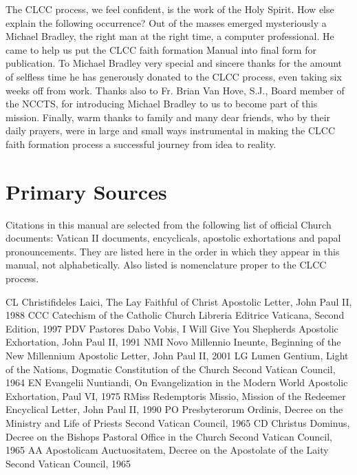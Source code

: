 \documentclass[oneside]{book}
\begin{document}
The CLCC process, we feel confident, is the work of the Holy Spirit. How else
explain the following occurrence? Out of the masses emerged mysteriously a
Michael Bradley, the right man at the right time, a computer professional. He
came to help us put the CLCC faith formation Manual into final form for
publication. To Michael Bradley very special and sincere thanks for the amount
of selfless time he has generously donated to the CLCC process, even taking six
weeks off from work. Thanks also to Fr. Brian Van Hove, S.J., Board member of
the NCCTS, for introducing Michael Bradley to us to become part of this
mission. Finally, warm thanks to family and many dear friends, who by their
daily prayers, were in large and small ways instrumental in making the CLCC
faith formation process a successful journey from idea to reality.


\pagebreak
\tableofcontents


\chapter{Primary Sources}

Citations in this manual are selected from the following list of official Church
documents: Vatican II documents, encyclicals, apostolic exhortations and papal
pronouncements. They are listed here in the order in which they appear in this
manual, not alphabetically. Also listed is nomenclature proper to the CLCC
process.

CL Christifideles Laici, The Lay Faithful of Christ Apostolic Letter, John Paul
II, 1988 CCC Catechism of the Catholic Church Libreria Editrice Vaticana, Second
Edition, 1997 PDV Pastores Dabo Vobis, I Will Give You Shepherds Apostolic
Exhortation, John Paul II, 1991 NMI Novo Millennio Ineunte, Beginning of the New
Millennium Apostolic Letter, John Paul II, 2001 LG Lumen Gentium, Light of the
Nations, Dogmatic Constitution of the Church Second Vatican Council, 1964 EN
Evangelii Nuntiandi, On Evangelization in the Modern World Apostolic
Exhortation, Paul VI, 1975 RMiss Redemptoris Missio, Mission of the Redeemer
Encyclical Letter, John Paul II, 1990 PO Presbyterorum Ordinis, Decree on the
Ministry and Life of Priests Second Vatican Council, 1965 CD Christus Dominus,
Decree on the Bishops Pastoral Office in the Church Second Vatican Council, 1965
AA Apostolicam Auctuositatem, Decree on the Apostolate of the Laity Second
Vatican Council, 1965
\end{document}
